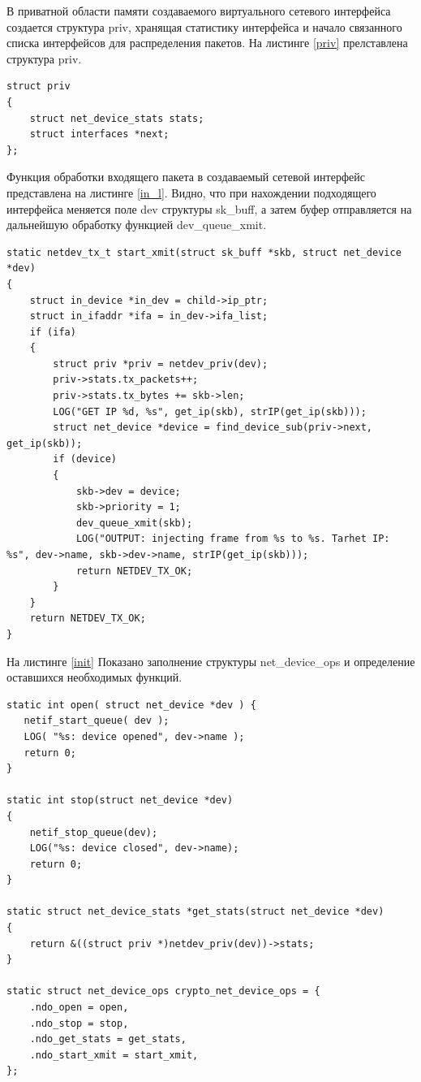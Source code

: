 \documentclass[14pt, a4paper]{extarticle}
\begin{document}
В приватной области памяти создаваемого виртуального сетевого интерфейса создается структура priv, хранящая статистику интерфейса и начало связанного списка интерфейсов для распределения пакетов. На листинге \ref{priv} прелставлена структура priv.
\begin{lstlisting}[caption=lst example, label=priv]
struct priv
{
    struct net_device_stats stats;
    struct interfaces *next;
};
\end{lstlisting}

Функция обработки входящего пакета в создаваемый сетевой интерфейс представлена на листинге \ref{in_l}. Видно, что при нахождении подходящего интерфейса меняется поле dev структуры sk\_buff, а затем буфер отправляется на дальнейшую обработку функцией dev\_queue\_xmit.
\begin{lstlisting}[caption=lst example, label=in_l]
static netdev_tx_t start_xmit(struct sk_buff *skb, struct net_device *dev)
{
    struct in_device *in_dev = child->ip_ptr;
    struct in_ifaddr *ifa = in_dev->ifa_list;
    if (ifa) 
    {
        struct priv *priv = netdev_priv(dev);
        priv->stats.tx_packets++;
        priv->stats.tx_bytes += skb->len;
        LOG("GET IP %d, %s", get_ip(skb), strIP(get_ip(skb)));
        struct net_device *device = find_device_sub(priv->next, get_ip(skb));
        if (device)
        {
            skb->dev = device;
            skb->priority = 1;
            dev_queue_xmit(skb);
            LOG("OUTPUT: injecting frame from %s to %s. Tarhet IP: %s", dev->name, skb->dev->name, strIP(get_ip(skb)));
            return NETDEV_TX_OK;
        }
    }
    return NETDEV_TX_OK;
}
\end{lstlisting}

На листинге \ref{init} Показано заполнение структуры net\_device\_ops и определение оставшихся необходимых функций.

\begin{lstlisting}[caption=lst example, label=init]
static int open( struct net_device *dev ) {
   netif_start_queue( dev );
   LOG( "%s: device opened", dev->name );
   return 0;
}

static int stop(struct net_device *dev)
{
    netif_stop_queue(dev);
    LOG("%s: device closed", dev->name);
    return 0;
}

static struct net_device_stats *get_stats(struct net_device *dev)
{
    return &((struct priv *)netdev_priv(dev))->stats;
}

static struct net_device_ops crypto_net_device_ops = {
    .ndo_open = open,
    .ndo_stop = stop,
    .ndo_get_stats = get_stats,
    .ndo_start_xmit = start_xmit,
};
\end{lstlisting}
\end{document}
